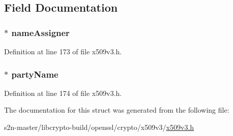 \subsection{Field Documentation}
\subsubsection[{\texorpdfstring{name\+Assigner}{nameAssigner}}]{ $\ast$ name\+Assigner}\hypertarget{struct_e_d_i_party_name__st_a21e63dff6ae89543736f5e5175a2dfed}{}\label{struct_e_d_i_party_name__st_a21e63dff6ae89543736f5e5175a2dfed}


Definition at line 173 of file x509v3.\+h.

\subsubsection[{\texorpdfstring{party\+Name}{partyName}}]{ $\ast$ party\+Name}\hypertarget{struct_e_d_i_party_name__st_a4b8db6494ccd6fd7619c6bbdb659a62a}{}\label{struct_e_d_i_party_name__st_a4b8db6494ccd6fd7619c6bbdb659a62a}


Definition at line 174 of file x509v3.\+h.



The documentation for this struct was generated from the following file\+:\begin{DoxyCompactItemize}
\item 
s2n-\/master/libcrypto-\/build/openssl/crypto/x509v3/\hyperlink{crypto_2x509v3_2x509v3_8h}{x509v3.\+h}\end{DoxyCompactItemize}
